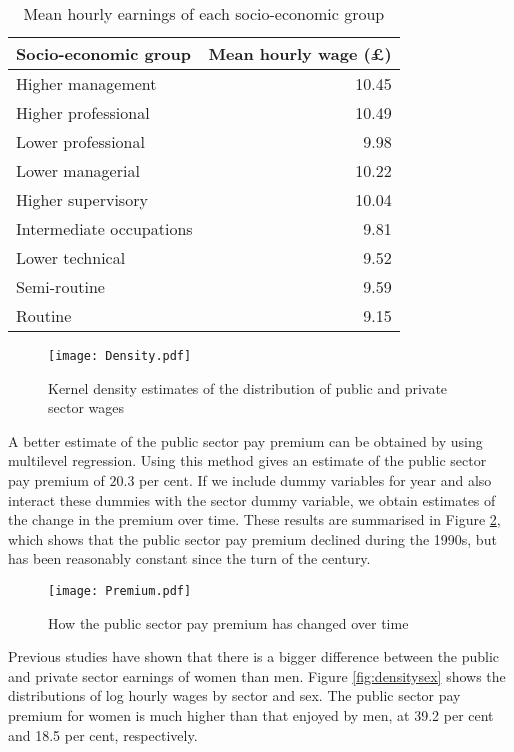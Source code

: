 \documentclass[a4paper,11pt,titlepage]{article}
\begin{document}
\begin{table}
\caption{Mean hourly earnings of each socio-economic group \label{tab:wages}}
\begin{center}
\begin{tabular}{lr}
\toprule
Socio-economic group & Mean hourly wage (\pounds)\\
\midrule
  Higher management & 10.45 \\
  Higher professional & 10.49 \\
  Lower professional & 9.98 \\
  Lower managerial & 10.22 \\
  Higher supervisory & 10.04 \\
  Intermediate occupations & 9.81 \\
  Lower technical & 9.52 \\
  Semi-routine & 9.59 \\
  Routine & 9.15 \\
\bottomrule
\end{tabular}
\end{center}
\end{table}

\begin{figure}[tb]
    \centering
    \texttt{[image: Density.pdf]}
    \caption{Kernel density estimates of the distribution of public and private sector wages\label{fig:density}}
\end{figure}

A better estimate of the public sector pay premium can be obtained by using multilevel regression.  Using this method gives an estimate of the public sector pay premium of $20.3$ per cent.  If we include dummy variables for year and also interact these dummies with the sector dummy variable, we obtain estimates of the change in the premium over time.  These results are summarised in Figure \ref{fig:premium}, which shows that the public sector pay premium declined during the 1990s, but has been reasonably constant since the turn of the century.

\begin{figure}[tb]
    \centering
    \texttt{[image: Premium.pdf]}
    \caption{How the public sector pay premium has changed over time\label{fig:premium}}
\end{figure}

Previous studies have shown that there is a bigger difference between the public and private sector earnings of women than men.  Figure \ref{fig:densitysex} shows the distributions of log hourly wages by sector and sex.  The public sector pay premium for women is much higher than that enjoyed by men, at 39.2 per cent and 18.5 per cent, respectively.
\end{document}
